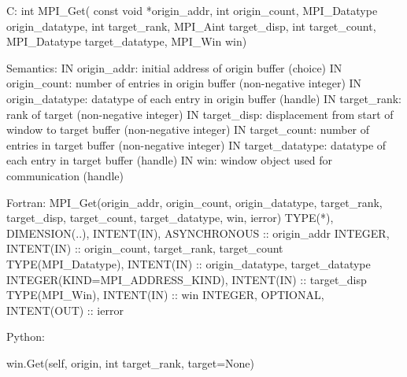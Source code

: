 C:
int MPI_Get(
  const void *origin_addr, int origin_count, MPI_Datatype origin_datatype,
  int target_rank,
  MPI_Aint target_disp, int target_count, MPI_Datatype target_datatype,
  MPI_Win win)

Semantics:
IN origin_addr: initial address of origin buffer (choice)
IN origin_count: number of entries in origin buffer (non-negative integer)
IN origin_datatype: datatype of each entry in origin buffer (handle)
IN target_rank: rank of target (non-negative integer)
IN target_disp: displacement from start of window to target buffer (non-negative integer)
IN target_count: number of entries in target buffer (non-negative integer)
IN target_datatype: datatype of each entry in target buffer (handle)
IN win: window object used for communication (handle)

Fortran:
MPI_Get(origin_addr, origin_count, origin_datatype,
  target_rank, target_disp, target_count, target_datatype, win, ierror)
TYPE(*), DIMENSION(..), INTENT(IN), ASYNCHRONOUS :: origin_addr
INTEGER, INTENT(IN) :: origin_count, target_rank, target_count
TYPE(MPI_Datatype), INTENT(IN) :: origin_datatype, target_datatype
INTEGER(KIND=MPI_ADDRESS_KIND), INTENT(IN) :: target_disp
TYPE(MPI_Win), INTENT(IN) :: win
INTEGER, OPTIONAL, INTENT(OUT) :: ierror

Python:

win.Get(self, origin, int target_rank, target=None)
